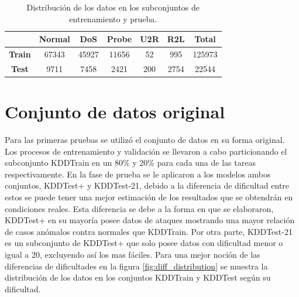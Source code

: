 \begin{table}[h]
    \begin{center}
        \caption{Distribución de los datos en los subconjuntos de entrenamiento y prueba.}
        
        \label{tab:atk_counts}
        \begin{tabular}{c|c|c|c|c|c|c} %
        \textbf{} & \textbf{Normal} & \textbf{DoS} & \textbf{Probe} & \textbf{U2R} & \textbf{R2L} & \textbf{Total}\\
        \hline
        \textbf{Train} & 67343 & 45927 & 11656 & 52 & 995 & 125973\\
        \textbf{Test} & 9711 & 7458 & 2421 & 200 & 2754 & 22544\\
        \end{tabular}
    \end{center}
\end{table}

\section{Conjunto de datos original}
Para las primeras pruebas se utilizó el conjunto de datos en su forma original. Los procesos de entrenamiento y validación se llevaron a cabo particionando el subconjunto KDDTrain en un 80\% y 20\% para cada una de las tareas respectivamente. En la fase de prueba se le aplicaron a los modelos ambos conjuntos, KDDTest+ y KDDTest-21, debido a la diferencia de dificultad entre estos se puede tener una mejor estimación de los resultados que se obtendrán en condiciones reales. Esta diferencia se debe a la forma en que se elaboraron, KDDTest+ en su mayoría posee datos de ataques mostrando una mayor relación de casos anómalos contra normales que KDDTrain. Por otra parte, KDDTest-21 es un subconjunto de KDDTest+ que solo posee datos con dificultad menor o igual a 20, excluyendo así los mas fáciles. Para una mejor noción de las diferencias de dificultades en la figura \ref{fig:diff_distribution} se muestra la distribución de los datos en los conjuntos KDDTrain y KDDTest según su dificultad.

